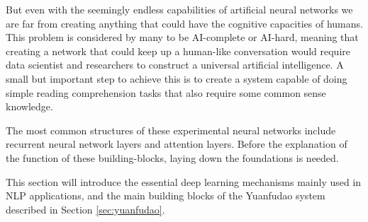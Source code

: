 But even with the seemingly endless capabilities of artificial neural networks we are far from creating anything that could have the cognitive capacities of humans. This problem is considered by many to be AI-complete or AI-hard, meaning that creating a network that could keep up a human-like conversation would require data scientist and researchers to construct a universal artificial intelligence. A small but important step to achieve this is to create a system capable of doing simple reading comprehension tasks that also require some common sense knowledge.

The most common structures of these experimental neural networks include recurrent neural network layers and attention layers. Before the explanation of the function of these building-blocks, laying down the foundations is needed.

This section will introduce the essential deep learning mechanisms mainly used in NLP applications, and the main building blocks of the Yuanfudao system described in Section \ref{sec:yuanfudao}.

